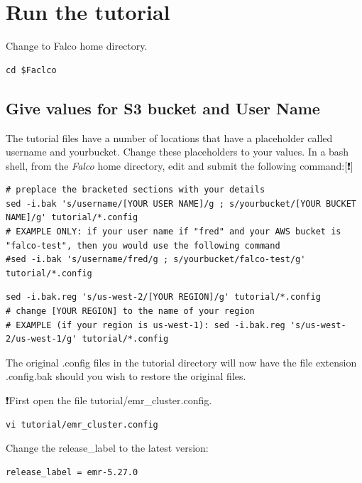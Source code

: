 \documentclass[
]{book}
\begin{document}
\hypertarget{run-the-tutorial}{%
\chapter{Run the tutorial}\label{run-the-tutorial}}

Change to Falco home directory.

\begin{verbatim}
cd $Faclco
\end{verbatim}

\hypertarget{give-values-for-s3-bucket-and-user-name}{%
\section{Give values for S3 bucket and User Name}\label{give-values-for-s3-bucket-and-user-name}}

The tutorial files have a number of locations that have a placeholder called username and yourbucket. Change these placeholders to your values. In a bash shell, from the \emph{Falco} home directory, edit and submit the following command:{[}❗️{]}

\begin{verbatim}
# preplace the bracketed sections with your details
sed -i.bak 's/username/[YOUR USER NAME]/g ; s/yourbucket/[YOUR BUCKET NAME]/g' tutorial/*.config
# EXAMPLE ONLY: if your user name if "fred" and your AWS bucket is "falco-test", then you would use the following command
#sed -i.bak 's/username/fred/g ; s/yourbucket/falco-test/g' tutorial/*.config
\end{verbatim}

\begin{verbatim}
sed -i.bak.reg 's/us-west-2/[YOUR REGION]/g' tutorial/*.config
# change [YOUR REGION] to the name of your region
# EXAMPLE (if your region is us-west-1): sed -i.bak.reg 's/us-west-2/us-west-1/g' tutorial/*.config
\end{verbatim}

The original .config files in the tutorial directory will now have the file extension .config.bak should you wish to restore the original files.

❗First open the file tutorial/emr\_cluster.config.

\begin{verbatim}
vi tutorial/emr_cluster.config
\end{verbatim}

Change the release\_label to the latest version:

\begin{verbatim}
release_label = emr-5.27.0
\end{verbatim}
\end{document}

